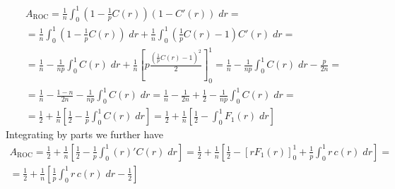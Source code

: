 %
\begin{multline*}
    A_\text{ROC}
        = \frac{1}{n} \int_{0}^{1} (1 - \frac{1}{p}C(r)) \left(1 - C'(r)\right) \;dr
    =\\
        = \frac{1}{n} \int_{0}^{1} (1 - \frac{1}{p}C(r)) \;dr
        + \frac{1}{n} \int_{0}^{1} (\frac{1}{p}C(r) - 1) C'(r) \;dr
    =\\
        = \frac{1}{n} - \frac{1}{np}\int_{0}^{1} C(r) \;dr
        + \frac{1}{n} \left[p \frac{(\frac{1}{p}C(r)-1)^2}{2} \right]_0^1
        = \frac{1}{n} - \frac{1}{np}\int_{0}^{1} C(r) \;dr - \frac{p}{2n}
    =\\
        = \frac{1}{n} - \frac{1-n}{2n} - \frac{1}{np}\int_{0}^{1} C(r) \;dr
        = \frac{1}{n} - \frac{1}{2n} + \frac{1}{2} - \frac{1}{np}\int_{0}^{1} C(r) \;dr
    =\\
        =  \frac{1}{2} + \frac{1}{n}\left[\frac{1}{2} - \frac{1}{p}\int_{0}^{1} C(r) \;dr\right]
        =  \frac{1}{2} + \frac{1}{n}\left[\frac{1}{2} - \int_{0}^{1} F_1(r) \;dr\right]
\end{multline*}
%
Integrating by parts we further have
%
\begin{multline}
    A_\text{ROC}
        =  \frac{1}{2} + \frac{1}{n}\left[\frac{1}{2} - \frac{1}{p}\int_{0}^{1} (r)'C(r)\;dr\right]
        = \frac{1}{2}
        + \frac{1}{n}\left[
            \frac{1}{2}
            - \left[rF_1(r)\right]_0^1
            + \frac{1}{p} \int_{0}^{1} r\,c(r) \;dr
        \right]
        =\\
        = \frac{1}{2}
        +\frac{1}{n}\left[
            \frac{1}{p} \int_{0}^{1} r\,c(r) \;dr
            - \frac{1}{2}
        \right]
    \label{eq:auroc}
\end{multline}
